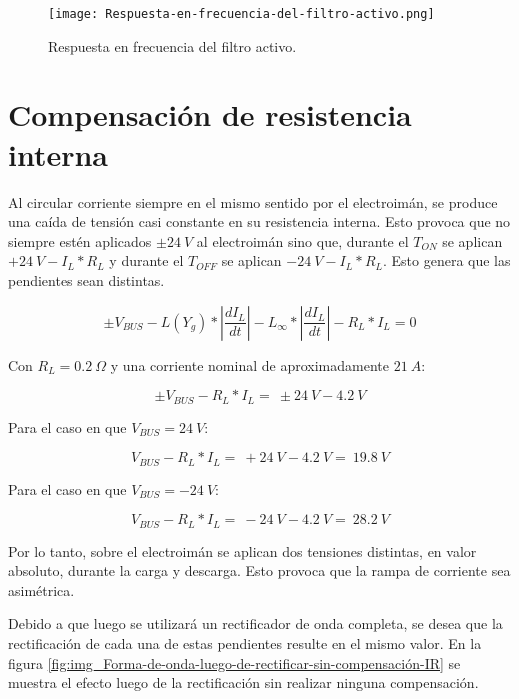 \begin{figure}[H]
	\centering
	\texttt{[image: Respuesta-en-frecuencia-del-filtro-activo.png]}
	\caption{Respuesta en frecuencia del filtro activo.}
	\label{fig:img_Respuesta-en-frecuencia-del-filtro-activo}
\end{figure}

\section{Compensaci\'{o}n de resistencia interna}

\noindent Al circular corriente siempre en el mismo sentido por el electroim\'{a}n, se produce una ca\'{i}da de tensi\'{o}n casi constante en su resistencia interna. Esto provoca que no siempre est\'{e}n aplicados $\pm 24\:V$ al electroim\'{a}n sino que, durante el $T_{ON}$ se aplican $+24\:V-I_L*R_L$ y durante el $T_{OFF}$ se aplican $-24\:V-I_L*R_L$. Esto genera que las pendientes sean distintas.

\begin{equation} \label{eq_Vbus-didt-RL}
\pm V_{BUS}-L(Y_g)*\left|\frac{{dI}_L}{dt}\right|-L_{\infty }*\left|\frac{{dI}_L}{dt}\right|-R_L*I_L=0
\end{equation}

\noindent Con  $R_L=0.2 \:\Omega$ y una corriente nominal  de aproximadamente $21\:A$:

\begin{equation} \label{eq_Vbus-didt-RL-2}
\pm V_{BUS}-R_L*I_L=\ \pm 24\:V-4.2\:V
\end{equation}

\noindent Para el caso en que $V_{BUS}=24\:V$:

\begin{equation} \label{eq_Vbus-didt-RL-3}
	V_{BUS}-R_L*I_L=\ +24\:V-4.2\:V=\ 19.8\:V
\end{equation}

\noindent Para el caso en que $V_{BUS}=-24\:V$:

\begin{equation} \label{eq_Vbus-didt-RL-4}
	V_{BUS}-R_L*I_L=\ -24\:V-4.2\:V=\ 28.2\:V
\end{equation}

\noindent Por lo tanto, sobre el electroim\'{a}n se aplican dos tensiones distintas, en valor absoluto, durante la carga y descarga. Esto provoca que la rampa de corriente sea asim\'{e}trica.

\noindent Debido a que luego se utilizar\'{a} un rectificador de onda completa, se desea que la rectificaci\'{o}n de cada una de estas pendientes resulte en el mismo valor. En la figura \ref{fig:img_Forma-de-onda-luego-de-rectificar-sin-compensación-IR} se muestra el efecto luego de la rectificaci\'{o}n sin realizar ninguna compensaci\'{o}n.

